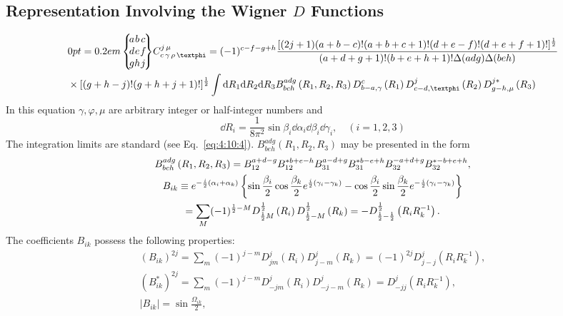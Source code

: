 \subsection{Representation Involving the Wigner $D$ Functions}\label{sec:10.3.2}
\begin{align}
& \ninej{a}{b}{c}{d}{e}{f}{g}{h}{j} \clebsch{c}{\gamma}{\rho}{\varphi}{j}{\mu}=(-1)^{c-f-g+h} \frac{[(2 j+1)(a+b-c)!(a+b+c+1)!(d+e-f)!(d+e+f+1)!]^{\frac{1}{2}}}{(a+d+g+1)!(b+e+h+1)!\Delta(a d g) \Delta(b e h)}  \notag\\
& \times[(g+h-j)!(g+h+j+1)!]^{\frac{1}{2}} \int \dd R_{1} \dd R_{2} \dd R_{3} B_{b c h}^{a d g}\left(R_{1}, R_{2}, R_{3}\right) D_{b-a, \gamma}^{c}\left(R_{1}\right) D_{c-d, \varphi}^{j}\left(R_{2}\right) D_{g-h, \mu}^{j *}\left(R_{3}\right) \label{eq:10:3:2}
\end{align}
In this equation $\gamma, \varphi, \mu$ are arbitrary integer or half-integer numbers and
\begin{equation}
\dd R_{i}=\frac{1}{8 \pi^{2}} \sin \beta_{i} \dd \alpha_{i} \dd \beta_{i} \dd \gamma_{i}, \quad(i=1,2,3) \label{eq:10:3:3}
\end{equation}
The integration limits are standard (see Eq.~\eqref{eq:4:10:4}). $B_{b e h}^{a d g}\left(R_{1}, R_{2}, R_{3}\right)$ may be presented in the form
\begin{gather}
B_{b c h}^{a d g}\left(R_{1}, R_{2}, R_{3}\right)=B_{12}^{a+d-g} B_{12}^{* b+e-h} B_{31}^{a-d+g} B_{31}^{* b-e+h} B_{32}^{-a+d+g} B_{32}^{*-b+e+h} , \label{eq:10:3:4}\\
B_{i k} \equiv e^{-\frac{i}{2}\left(\alpha_{i}+\alpha_{k}\right)}\left\{\sin \frac{\beta_{i}}{2} \cos \frac{\beta_{k}}{2} e^{\frac{i}{2}\left(\gamma_{i}-\gamma_{k}\right)}-\cos \frac{\beta_{i}}{2} \sin \frac{\beta_{k}}{2} e^{-\frac{i}{2}\left(\gamma_{i}-\gamma_{k}\right)}\right\}  \notag\\
=\sum_{M}(-1)^{\frac{1}{2}-M} D_{\frac{1}{2} M}^{\frac{1}{2}}\left(R_{i}\right) D_{\frac{1}{2}-M}^{\frac{1}{2}}\left(R_{k}\right)=-D_{\frac{1}{2}-\frac{1}{2}}^{\frac{1}{2}}\left(R_{i} R_{k}^{-1}\right) \label{eq:10:3:5}.
\end{gather}
The coefficients $B_{i k}$ possess the following properties:
\begin{gather}
\left(B_{i k}\right)^{2 j}=\sum_{m}(-1)^{j-m} D_{j m}^{j}\left(R_{i}\right) D_{j-m}^{j}\left(R_{k}\right)=(-1)^{2 j} D_{j-j}^{j}\left(R_{i} R_{k}^{-1}\right) , \label{eq:10:3:6}\\
\left(B_{i k}^{*}\right)^{2 j}=\sum_{m}(-1)^{j-m} D_{-j m}^{j}\left(R_{i}\right) D_{-j-m}^{j}\left(R_{k}\right)=D_{-j j}^{j}\left(R_{i} R_{k}^{-1}\right),  \label{eq:10:3:7}\\
\left|B_{i k}\right|=\sin \frac{\Omega_{i k}}{2}, \label{eq:10:3:8}
\end{gather}
